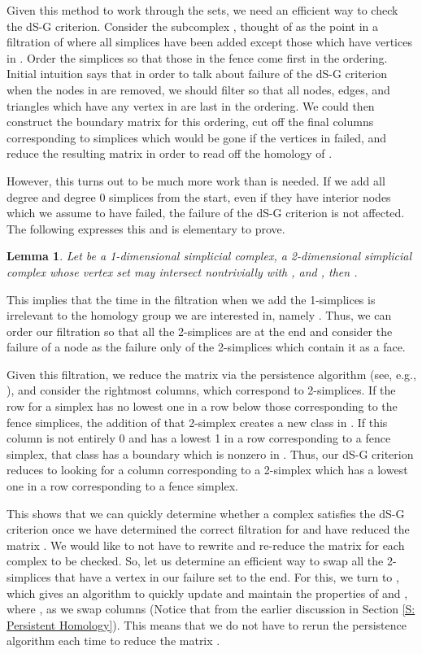 \documentclass[10pt,twocolumn]{article} \usepackage{amsmath,epsf,amssymb,cite,pifont,amsthm, mathrsfs,epsfig,  bbm, amsthm,  setspace}
\newtheorem{lemma}{Lemma}
\renewcommand{\1}{\mathbbm{1}}
\begin{document}
Given this method to work through the sets, we need an efficient way
to check the dS-G criterion.
Consider the subcomplex , thought of as the point in a filtration of
 where all simplices have been added except those which have vertices in .
Order the simplices so that those in the fence come first in the ordering.
Initial intuition says that in order to talk about failure of the dS-G criterion when the nodes in  are removed,
we should filter  so that all nodes, edges,
and triangles which have any vertex in  are last in the ordering.
We could then construct the boundary matrix for this ordering,
cut off the final columns corresponding to simplices which would be gone if the vertices in  failed,
and reduce the resulting matrix in order to read off the homology of .

However, this turns out to be much more work than is needed.
If we add all degree  and degree 0 simplices from the start,
even if they have interior nodes which we assume
to have failed,  the failure of the dS-G criterion is not affected.
The following expresses this and is elementary to prove.
\begin{lemma}
Let  be a 1-dimensional simplicial complex,
 a 2-dimensional simplicial complex whose vertex set may intersect nontrivially with , and , then
.
	\label{L: Extra Frame Stuff}
\end{lemma}


This implies that the time in the filtration when we add the 1-simplices is irrelevant to the homology group we are interested in,
namely .
Thus, we can order our filtration so that all the 2-simplices are at the end
and consider the failure of a node as the failure only of the 2-simplices which contain it as a face.


Given this filtration, we reduce the matrix  via the persistence algorithm (see, e.g., \cite{Edelsbrunner2010}),
and consider the rightmost columns, which correspond to 2-simplices.
If the row for a simplex has no lowest one in a row below those corresponding
to the fence simplices, the addition of that 2-simplex creates a new class in .
If this column is not entirely 0 and has a lowest 1 in a row corresponding to a fence simplex,
that class has a boundary which is nonzero in .
Thus, our dS-G criterion reduces to looking for a column corresponding to a 2-simplex which has a
lowest one in a row corresponding to a fence simplex.


This shows that we can quickly determine  whether a complex satisfies the dS-G criterion  once we have
determined the correct filtration for  and have reduced the matrix .
We would like to not have to rewrite and re-reduce the matrix  for each complex  to be checked.
So, let us determine an efficient way to swap all the 2-simplices that
have a vertex in our failure set  to the end.
For this, we turn to \cite{Cohen-Steiner2006}, which gives an algorithm to quickly update and
maintain the properties of  and , where , as we swap columns (Notice that  from the earlier discussion in Section \ref{S: Persistent Homology}).
This means that we do not have to  rerun the persistence algorithm each time to reduce the matrix .
\end{document}
